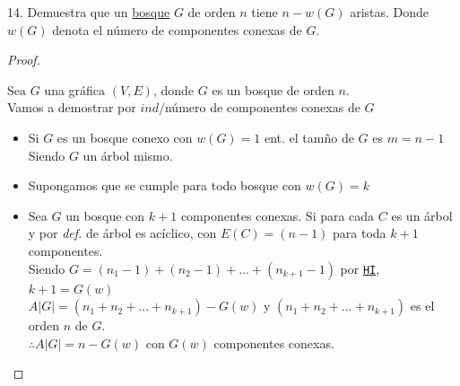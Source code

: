 \documentclass{article}
\begin{document}
\begin{justify}
  14. Demuestra que un \underline{bosque} $G$ de orden $n$ tiene $n-w(G)$ aristas. Donde $w(G)$ denota el número de componentes conexas
  de $G$.
  \begin{proof}
    \begin{justify}
      Sea $G$ una gráfica $(V,E)$, donde $G$ es un bosque de orden $n$. \\
      Vamos a demostrar por $ind/$número de componentes conexas de $G$\\
      \begin{itemize}
      \item [case Base]
        Si $G$ es un bosque conexo con $w(G) = 1 $ ent. el tamño de $G$ es $m = n-1 $ Siendo $G$ un árbol mismo. \\
      \item [Hipotesis Inductiva]
        Supongamos que se cumple para todo bosque con $w(G) = k$ \\
      \item [Paso Inductivo] 
        Sea $G$ un bosque con $k+1$ componentes conexas. Si para cada $C$ es un árbol y por \textit{def.} de árbol es acíclico, con $E(C) =
        (n-1)$ para toda $k+1$ componentes. \\
        Siendo $G = (n_1 -1) + (n_2-1) + ... + (n_{k+1}-1)$ por \texttt{\underline{HI}}, $k+1 = G(w)$\\
        $A|G| = (n_1+n_2+...+n_{k+1})-G(w)$ y $(n_1+n_2+...+n_{k+1})$ es el orden $n$ de $G$. \\
        $\therefore A|G| = n- G(w)$ con $G(w)$ componentes conexas. \\ 
        
      \end{itemize}
    \end{justify}
  \end{proof}
\end{justify}
\end{document}
